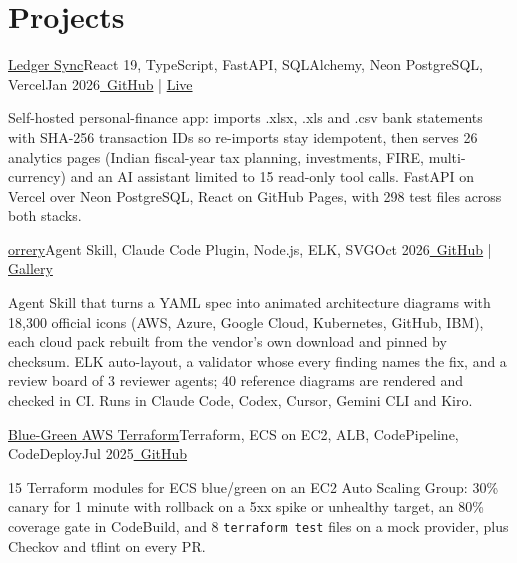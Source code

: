 \section{\textbf{Projects}}
\vspace{-2pt}
\resumeSubHeadingListStart

\resumeExp
{\href{https://sagargupta.online/ledger-sync/}{Ledger Sync}}{React 19, TypeScript, FastAPI, SQLAlchemy, Neon PostgreSQL, Vercel}{Jan 2026}{\href{https://github.com/Sagargupta16/ledger-sync}{\faGithub\ GitHub} | \href{https://sagargupta.online/ledger-sync/}{Live}}
\resumeItemListStart
    \item[$\diamond$] Self-hosted personal-finance app: imports .xlsx, .xls and .csv bank statements with SHA-256 transaction IDs so re-imports stay idempotent, then serves 26 analytics pages (Indian fiscal-year tax planning, investments, FIRE, multi-currency) and an AI assistant limited to 15 read-only tool calls. FastAPI on Vercel over Neon PostgreSQL, React on GitHub Pages, with 298 test files across both stacks.
\resumeItemListEnd

\resumeExp
{\href{https://sagargupta.online/orrery/}{orrery}}{Agent Skill, Claude Code Plugin, Node.js, ELK, SVG}{Oct 2026}{\href{https://github.com/Sagargupta16/orrery}{\faGithub\ GitHub} | \href{https://sagargupta.online/orrery/gallery/}{Gallery}}
\resumeItemListStart
    \item[$\diamond$] Agent Skill that turns a YAML spec into animated architecture diagrams with 18,300 official icons (AWS, Azure, Google Cloud, Kubernetes, GitHub, IBM), each cloud pack rebuilt from the vendor's own download and pinned by checksum. ELK auto-layout, a validator whose every finding names the fix, and a review board of 3 reviewer agents; 40 reference diagrams are rendered and checked in CI. Runs in Claude Code, Codex, Cursor, Gemini CLI and Kiro.
\resumeItemListEnd

\resumeExp
{\href{https://github.com/Sagargupta16/terraform-aws-ecs-blue-green}{Blue-Green AWS Terraform}}{Terraform, ECS on EC2, ALB, CodePipeline, CodeDeploy}{Jul 2025}{\href{https://github.com/Sagargupta16/terraform-aws-ecs-blue-green}{\faGithub\ GitHub}}
\resumeItemListStart
    \item[$\diamond$] 15 Terraform modules for ECS blue/green on an EC2 Auto Scaling Group: 30\% canary for 1 minute with rollback on a 5xx spike or unhealthy target, an 80\% coverage gate in CodeBuild, and 8 \texttt{terraform test} files on a mock provider, plus Checkov and tflint on every PR.
\resumeItemListEnd

